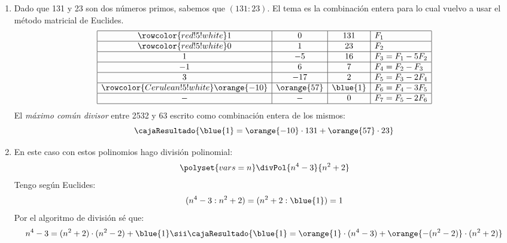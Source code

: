 \begin{enumerate}[label=\roman*)]
  \item Dado que 131 y 23 son dos números primos, sabemos que $(131:23)$. El tema es la combinación entera
        para lo cual vuelvo a usar el método matricial de Euclides.
        $$
          \begin{array}{|c|c|c|l|} \hline\rowcolor{red!5!white}
            1            & 0           & 131      & F_1              \\ \hline\rowcolor{red!5!white}
            0            & 1           & 23       & F_2              \\ \hline
            1            & -5          & 16       & F_3 = F_1 - 5F_2 \\ \hline
            -1           & 6           & 7        & F_4 = F_2 - F_3  \\ \hline
            3            & -17         & 2        & F_5 = F_3 - 2F_4 \\ \hline \rowcolor{Cerulean!5!white}
            \orange{-10} & \orange{57} & \blue{1} & F_6 = F_4 - 3F_5 \\ \hline
            -            & -           & 0        & F_7 = F_5 - 2F_6 \\ \hline
          \end{array}
        $$
        El \textit{máximo común divisor} entre 2532 y 63 escrito como combinación entera de los mismos:
        $$
          \cajaResultado{
            \blue{1} = \orange{-10} \cdot 131 + \orange{57} \cdot 23
          }
        $$

  \item
        En este caso con estos polinomios hago división polinomial:
        $$
          \polyset{vars=n}
          \divPol{n^4-3}{n^2+2}
        $$
        Tengo según Euclides:
        $$
          (n^4-3 : n^2+2) = (n^2+2 : \blue{1}) = 1
        $$
        Por el algoritmo de división sé que:
        $$
          n^4 - 3 =  (n^2+2) \cdot (n^2 - 2) + \blue{1}
          \sii
          \cajaResultado{
            \blue{1} = \orange{1} \cdot (n^4 - 3) + \orange{-(n^2 - 2)} \cdot (n^2 + 2)
          }
        $$
\end{enumerate}

\begin{aportes}
  \item {}
\end{aportes}
